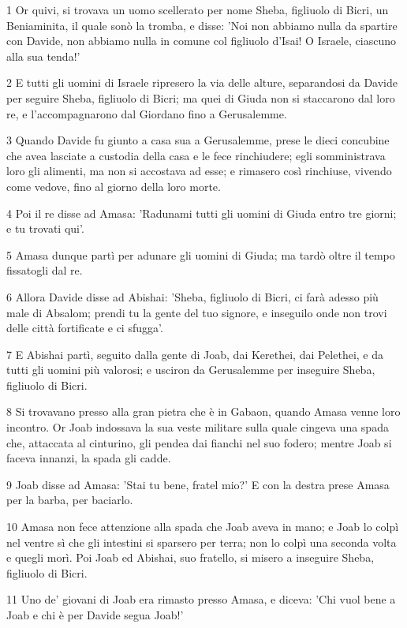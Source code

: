 \par 1 Or quivi, si trovava un uomo scellerato per nome Sheba, figliuolo di Bicri, un Beniaminita, il quale sonò la tromba, e disse: 'Noi non abbiamo nulla da spartire con Davide, non abbiamo nulla in comune col figliuolo d'Isai! O Israele, ciascuno alla sua tenda!'
\par 2 E tutti gli uomini di Israele ripresero la via delle alture, separandosi da Davide per seguire Sheba, figliuolo di Bicri; ma quei di Giuda non si staccarono dal loro re, e l'accompagnarono dal Giordano fino a Gerusalemme.
\par 3 Quando Davide fu giunto a casa sua a Gerusalemme, prese le dieci concubine che avea lasciate a custodia della casa e le fece rinchiudere; egli somministrava loro gli alimenti, ma non si accostava ad esse; e rimasero così rinchiuse, vivendo come vedove, fino al giorno della loro morte.
\par 4 Poi il re disse ad Amasa: 'Radunami tutti gli uomini di Giuda entro tre giorni; e tu trovati qui'.
\par 5 Amasa dunque partì per adunare gli uomini di Giuda; ma tardò oltre il tempo fissatogli dal re.
\par 6 Allora Davide disse ad Abishai: 'Sheba, figliuolo di Bicri, ci farà adesso più male di Absalom; prendi tu la gente del tuo signore, e inseguilo onde non trovi delle città fortificate e ci sfugga'.
\par 7 E Abishai partì, seguito dalla gente di Joab, dai Kerethei, dai Pelethei, e da tutti gli uomini più valorosi; e usciron da Gerusalemme per inseguire Sheba, figliuolo di Bicri.
\par 8 Si trovavano presso alla gran pietra che è in Gabaon, quando Amasa venne loro incontro. Or Joab indossava la sua veste militare sulla quale cingeva una spada che, attaccata al cinturino, gli pendea dai fianchi nel suo fodero; mentre Joab si faceva innanzi, la spada gli cadde.
\par 9 Joab disse ad Amasa: 'Stai tu bene, fratel mio?' E con la destra prese Amasa per la barba, per baciarlo.
\par 10 Amasa non fece attenzione alla spada che Joab aveva in mano; e Joab lo colpì nel ventre sì che gli intestini si sparsero per terra; non lo colpì una seconda volta e quegli morì. Poi Joab ed Abishai, suo fratello, si misero a inseguire Sheba, figliuolo di Bicri.
\par 11 Uno de' giovani di Joab era rimasto presso Amasa, e diceva: 'Chi vuol bene a Joab e chi è per Davide segua Joab!'
